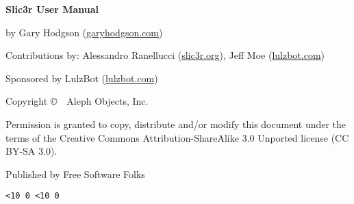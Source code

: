 \clearpage\null\vfill
\begingroup
\thispagestyle{empty}
\footnotesize\raggedright
\setlength{\parskip}{0.5\baselineskip}

\textbf{Slic3r User Manual}

by Gary Hodgson (\href{http://garyhodgson.com}{garyhodgson.com})

Contributions by: Alessandro Ranellucci (\href{http://slic3r.org}{slic3r.org}), Jeff Moe (\href{http://lulzbot.com}{lulzbot.com})

Sponsored by LulzBot\textsuperscript{\miniscule{\texttrademark}} (\href{http://lulzbot.com}{lulzbot.com})

Copyright \copyright\ \the\year\ Aleph Objects, Inc.\par
Permission is granted to copy, distribute and\slash or modify
this document under the terms of the
Creative Commons Attribution-ShareAlike 3.0 Unported license
(CC BY-SA 3.0).

Published by Free Software Folks

\hfill\texttt{\the\year\ifnum\month<10 0\fi\the\month
                \ifnum\day  <10 0\fi\the\day}
\endgroup
\pagebreak{}
